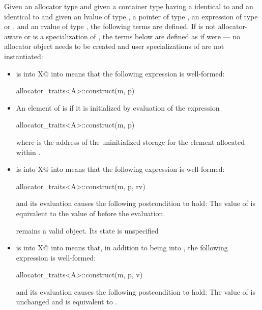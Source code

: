 \pnum
Given an allocator type 
and given a container type  having a  identical to 
and an  identical to 
and given an lvalue  of type ,
a pointer  of type ,
an expression  of type  or ,
and an rvalue  of type ,
the following terms are defined. If 
is not allocator-aware or is a specialization of ,
the terms below are defined as if  were
 --- no allocator object needs to be created
and user specializations of  are not instantiated:

\begin{itemize}
\item
{} is 
{ into X@ into }
means that the following expression is well-formed:
\begin{codeblock}
allocator_traits<A>::construct(m, p)
\end{codeblock}

\item
An element of  is  if it is initialized
by evaluation of the expression
\begin{codeblock}
allocator_traits<A>::construct(m, p)
\end{codeblock}
where  is the address of the uninitialized storage for the element
allocated within .

\item
{} is 
{ into X@ into }
means that the following expression
is well-formed:
\begin{codeblock}
allocator_traits<A>::construct(m, p, rv)
\end{codeblock}
and its evaluation causes the following postcondition to hold: The value
of  is equivalent to the value of  before the evaluation.
\begin{note}
 remains a valid object. Its state is unspecified
\end{note}

\item
{} is 
{ into X@ into }
means that, in addition to  being  into
, the following expression is well-formed:
\begin{codeblock}
allocator_traits<A>::construct(m, p, v)
\end{codeblock}
and its evaluation causes the following postcondition to hold:
The value of  is unchanged and is equivalent to .


\end{itemize}
